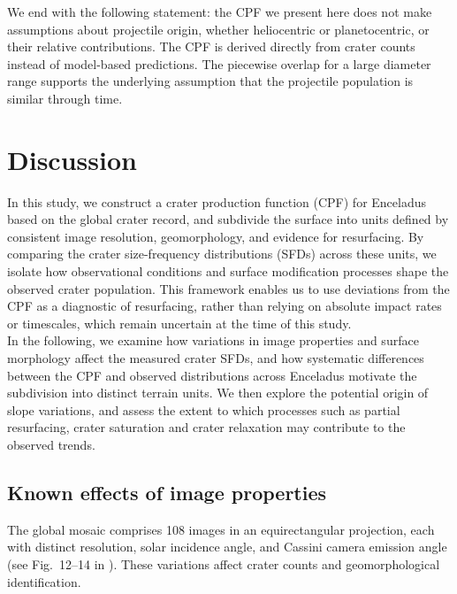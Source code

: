 \documentclass[preprint,11pt,3p,times,authoryear]{elsarticle}
\begin{document}
We end with the following statement: the CPF we present here does not make assumptions about projectile origin, whether heliocentric or planetocentric, or their relative contributions. The CPF is derived directly from crater counts instead of model-based predictions. The piecewise overlap for a large diameter range supports the underlying assumption that the projectile population is similar through time.


\section{Discussion}
\label{sec:discussion}
In this study, we construct a crater production function (CPF) for Enceladus based on the global crater record, and subdivide the surface into units defined by consistent image resolution, geomorphology, and evidence for resurfacing. By comparing the crater size-frequency distributions (SFDs) across these units, we isolate how observational conditions and surface modification processes shape the observed crater population. This framework enables us to use deviations from the CPF as a diagnostic of resurfacing, rather than relying on absolute impact rates or timescales, which remain uncertain at the time of this study.\\

In the following, we examine how variations in image properties and surface morphology affect the measured crater SFDs, and how systematic differences between the CPF and observed distributions across Enceladus motivate the subdivision into distinct terrain units. We then explore the potential origin of slope variations, and assess the extent to which processes such as partial resurfacing, crater saturation and crater relaxation may contribute to the observed trends. 

\subsection{Known effects of image properties}
\label{sub:instrumental}
The global mosaic comprises 108 images in an equirectangular projection, each with distinct resolution, solar incidence angle, and Cassini camera emission angle (see Fig.~12–14 in \citet{Bland2018}). These variations affect crater counts and geomorphological identification. \\
\end{document}
